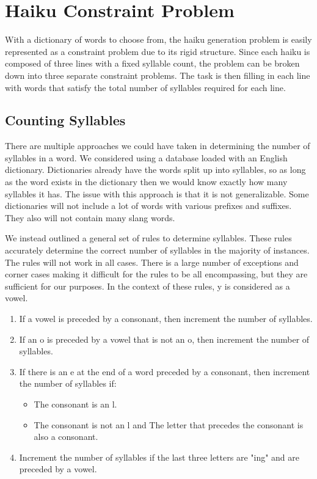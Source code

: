 \documentclass[]{article}
\begin{document}
\section{Haiku Constraint Problem}
With a dictionary of words to choose from, the haiku generation problem is easily represented as a constraint problem due to its rigid structure. Since each haiku is composed of three lines with a fixed syllable count, the problem can be broken down into three separate constraint problems. The task is then filling in each line with words that satisfy the total number of syllables required for each line.

\subsection{Counting Syllables}
There are multiple approaches we could have taken in determining the number of syllables in a word. We considered using a database loaded with an English dictionary. Dictionaries already have the words split up into syllables, so as long as the word exists in the dictionary then we would know exactly how many syllables it has. The issue with this approach is that it is not generalizable. Some dictionaries will not include a lot of words with various prefixes and suffixes. They also will not contain many slang words.

We instead outlined a general set of rules to determine syllables. These rules accurately determine the correct number of syllables in the majority of instances. The rules will not work in all cases. There is a large number of exceptions and corner cases making it difficult for the rules to be all encompassing, but they are sufficient for our purposes. In the context of these rules, y is considered as a vowel\cite{syllables}.
\begin{enumerate}
	\item If a vowel is preceded by a consonant, then increment the number of syllables.
	\item If an o is preceded by a vowel that is not an o, then increment the number of syllables.
	\item If there is an e at the end of a word preceded by a consonant, then increment the number of syllables if:
	\begin{itemize}
		\item The consonant is an l.
		\item The consonant is not an l and The letter that precedes the consonant is also a consonant.
	\end{itemize}
	\item Increment the number of syllables if the last three letters are "ing" and are preceded by a vowel.
\end{enumerate}
\end{document}
